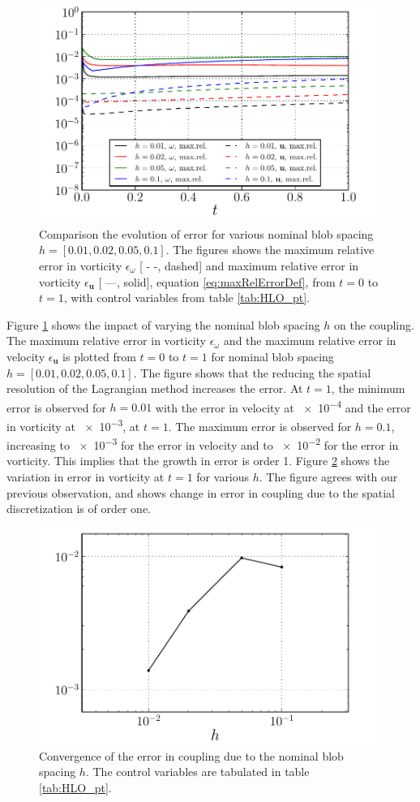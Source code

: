 	\begin{figure}[!h]
	\centering
	\includegraphics[width=0.6\linewidth]{./figures/hybrid/lambOseen/lambOseen_parameter_h.pdf}
	\caption{Comparison the evolution of error for various nominal blob spacing $h = [0.01,0.02,0.05,0.1]$. The figures shows the maximum relative error in vorticity $\epsilon_{\omega}$ [ - -, dashed] and maximum relative error in vorticity $\epsilon_{\mathbf{u}}$ [ ---, solid], equation \ref{eq:maxRelErrorDef}, from $t=0$ to $t=1$, with control variables from table \ref{tab:HLO_pt}.}
	\label{fig:lambOseen_parameter_h}
	\end{figure}	
	
Figure \ref{fig:lambOseen_parameter_h} shows the impact of varying the nominal blob spacing $h$ on the coupling. The maximum relative error in vorticity $\epsilon_{\omega}$ and the maximum relative error in velocity $\epsilon_{\mathbf{u}}$ is plotted from $t=0$ to $t=1$ for nominal blob spacing $h = [0.01,0.02,0.05,0.1]$. The figure shows that the reducing the spatial resolution of the Lagrangian method increases the error. At $t=1$, the minimum error is observed for $h=0.01$ with the error in velocity at \num{e-4} and the error in vorticity at \num{e-3}, at $t=1$. The maximum error is observed for $h=0.1$, increasing to \num{e-3} for the error in velocity and to \num{e-2} for the error in vorticity. This implies that the growth in error is order 1. Figure \ref{fig:lambOseen_parameter_h_Trend} shows the variation in error in vorticity at $t=1$ for various $h$. The figure agrees with our previous observation, and shows change in error in coupling due to the spatial discretization is of order one.

	\begin{figure}[!h]
	\centering
	\includegraphics[width=0.6\linewidth]{./figures/hybrid/lambOseen/lambOseen_parameter_h_Trend.pdf}
	\caption{Convergence of the error in coupling due to the nominal blob spacing $h$. The control variables are tabulated in table \ref{tab:HLO_pt}.}
	\label{fig:lambOseen_parameter_h_Trend}
	\end{figure}	

